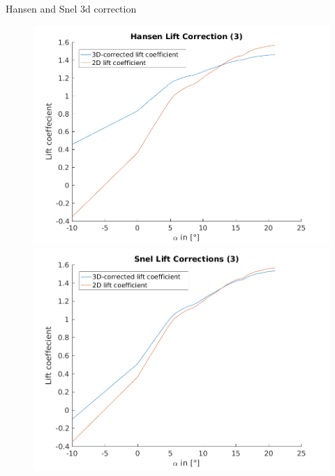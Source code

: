 \documentclass[12pt,t]{beamer}
\begin{document}
\begin{frame}
\huge
Hansen and Snel 3d correction
\Tiny
\begin{figure}[H]
	\begin{center}
		\begin{minipage}[t]{0.45\linewidth}
			\centering
		\includegraphics[width=\linewidth]{../CIP_2/Figures/hansen_lift_correction_3.png}
		\end{minipage}
		\begin{minipage}[t]{0.45\linewidth}
			\centering
			\includegraphics[width=\linewidth]{../CIP_2/Figures/snel_correction_3.png}
		\end{minipage}
	\end{center}

\end{figure}
\end{frame}
\end{document}
